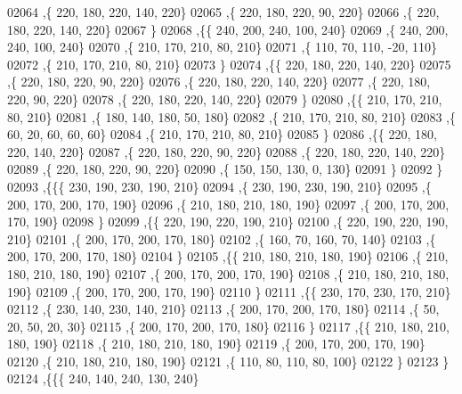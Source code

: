 \begin{DoxyCode}
02064     ,\{   220,   180,   220,   140,   220\}
02065     ,\{   220,   180,   220,    90,   220\}
02066     ,\{   220,   180,   220,   140,   220\}
02067     \}
02068    ,\{\{   240,   200,   240,   100,   240\}
02069     ,\{   240,   200,   240,   100,   240\}
02070     ,\{   210,   170,   210,    80,   210\}
02071     ,\{   110,    70,   110,   -20,   110\}
02072     ,\{   210,   170,   210,    80,   210\}
02073     \}
02074    ,\{\{   220,   180,   220,   140,   220\}
02075     ,\{   220,   180,   220,    90,   220\}
02076     ,\{   220,   180,   220,   140,   220\}
02077     ,\{   220,   180,   220,    90,   220\}
02078     ,\{   220,   180,   220,   140,   220\}
02079     \}
02080    ,\{\{   210,   170,   210,    80,   210\}
02081     ,\{   180,   140,   180,    50,   180\}
02082     ,\{   210,   170,   210,    80,   210\}
02083     ,\{    60,    20,    60,    60,    60\}
02084     ,\{   210,   170,   210,    80,   210\}
02085     \}
02086    ,\{\{   220,   180,   220,   140,   220\}
02087     ,\{   220,   180,   220,    90,   220\}
02088     ,\{   220,   180,   220,   140,   220\}
02089     ,\{   220,   180,   220,    90,   220\}
02090     ,\{   150,   150,   130,     0,   130\}
02091     \}
02092    \}
02093   ,\{\{\{   230,   190,   230,   190,   210\}
02094     ,\{   230,   190,   230,   190,   210\}
02095     ,\{   200,   170,   200,   170,   190\}
02096     ,\{   210,   180,   210,   180,   190\}
02097     ,\{   200,   170,   200,   170,   190\}
02098     \}
02099    ,\{\{   220,   190,   220,   190,   210\}
02100     ,\{   220,   190,   220,   190,   210\}
02101     ,\{   200,   170,   200,   170,   180\}
02102     ,\{   160,    70,   160,    70,   140\}
02103     ,\{   200,   170,   200,   170,   180\}
02104     \}
02105    ,\{\{   210,   180,   210,   180,   190\}
02106     ,\{   210,   180,   210,   180,   190\}
02107     ,\{   200,   170,   200,   170,   190\}
02108     ,\{   210,   180,   210,   180,   190\}
02109     ,\{   200,   170,   200,   170,   190\}
02110     \}
02111    ,\{\{   230,   170,   230,   170,   210\}
02112     ,\{   230,   140,   230,   140,   210\}
02113     ,\{   200,   170,   200,   170,   180\}
02114     ,\{    50,    20,    50,    20,    30\}
02115     ,\{   200,   170,   200,   170,   180\}
02116     \}
02117    ,\{\{   210,   180,   210,   180,   190\}
02118     ,\{   210,   180,   210,   180,   190\}
02119     ,\{   200,   170,   200,   170,   190\}
02120     ,\{   210,   180,   210,   180,   190\}
02121     ,\{   110,    80,   110,    80,   100\}
02122     \}
02123    \}
02124   ,\{\{\{   240,   140,   240,   130,   240\}

\end{DoxyCode}
